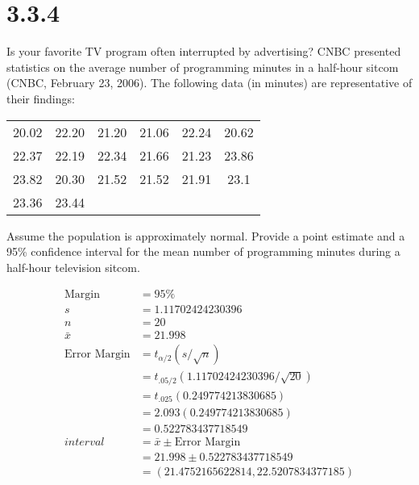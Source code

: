 \documentclass{article}
\begin{document}
\section*{3.3.4}
Is your favorite TV program often interrupted by advertising? CNBC presented statistics on the average number of programming minutes in a half-hour sitcom (CNBC, February 23, 2006). The following data (in minutes) are representative of their findings:
\begin{table}[h!]
  \centering
  \begin{tabular}{c c c c c c}
    20.02&22.20&21.20&21.06&22.24&20.62\\
    22.37&22.19&22.34&21.66&21.23&23.86\\
    23.82&20.30&21.52&21.52&21.91&23.1\\
    23.36&23.44&&&&\\
  \end{tabular}
\end{table}
Assume the population is approximately normal. Provide a point estimate and a 95\% confidence interval for the mean number of programming minutes during a half-hour television sitcom.

\begin{align*}
  \text{Margin} &= 95\%\\
  s &= 1.11702424230396\\
  n &= 20\\
  \bar{x} &= 21.998\\
  \text{Error Margin} &= t_{\alpha/2}(s/ \sqrt{n})\\
  &=t_{.05/2}(1.11702424230396/ \sqrt{20})\\
  &=t_{.025}(0.249774213830685)\\
  &=2.093(0.249774213830685)\\
  &=0.522783437718549\\
  interval &= \bar{x} \pm \text{Error Margin}\\
  &= 21.998 \pm 0.522783437718549\\
  &= (21.4752165622814, 22.5207834377185)
\end{align*}
\end{document}
